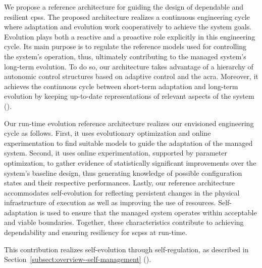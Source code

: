\begin{description}[style=unboxed,leftmargin=0cm,font=\bfseries\normalsize]
	\item[Run-Time Evolution Reference Architecture\autodot]

	We propose a reference architecture for guiding the design of dependable and resilient \glspl{cps}. The proposed architecture realizes a continuous engineering cycle where adaptation and evolution work cooperatively to achieve the system goals. Evolution plays both a reactive and a proactive role explicitly in this engineering cycle. Its main purpose is to regulate the reference models used for controlling the system's operation, thus, ultimately contributing to the managed system's long-term evolution. To do so, our architecture takes advantage of a hierarchy of autonomic control structures based on adaptive control and the \gls{acra}. Moreover, it achieves the continuous cycle between short-term adaptation and long-term evolution by keeping up-to-date representations of relevant aspects of the system ().

	Our run-time evolution reference architecture realizes our envisioned engineering cycle as follows. First, it uses evolutionary optimization and online experimentation to find suitable models to guide the adaptation of the managed system. Second, it uses online experimentation, supported by parameter optimization, to gather evidence of statistically significant improvements over the system's baseline design, thus generating knowledge of possible configuration states and their respective performances. Lastly, our reference architecture accommodates self-evolution for reflecting persistent changes in the physical infrastructure of execution as well as improving the use of resources. Self-adaptation is used to ensure that the managed system operates within acceptable and viable boundaries. Together, these characteristics contribute to achieving dependability and ensuring resiliency for \glspl{scps} at run-time.


	This contribution realizes self-evolution through self-regulation, as described in Section~\ref{subsect:overview--self-management} ().


\end{description}
